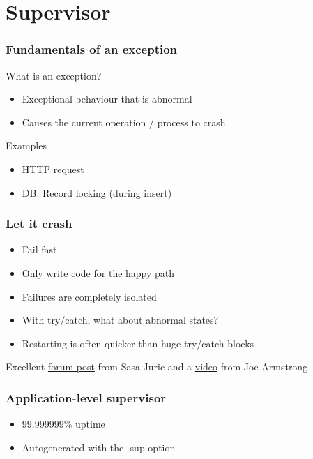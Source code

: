 \section{Supervisor}

\frame{\tableofcontents[currentsection]}

\begin{frame}
    \frametitle{Fundamentals of an exception}
    What is an exception?
     \begin{itemize}
         \item Exceptional behaviour that is abnormal
         \item Causes the current operation / process to crash
     \end{itemize}

     \vfill
     
     Examples
     \begin{itemize}
         \item HTTP request
         \item DB: Record locking (during insert)
     \end{itemize}
\end{frame}


\begin{frame}
    \frametitle{Let it crash}
    \begin{itemize}
         \item Fail fast
         \item Only write code for the happy path
         \item Failures are completely isolated
         \item With try/catch, what about abnormal states?
         \item Restarting is often quicker than huge try/catch blocks
    \end{itemize}
    
    \vfill

    \tiny 
    Excellent 
    \href{https://elixirforum.com/t/understanding-the-advantages-of-let-it-crash-term/9748/19?u=wfransen}{forum post} 
    from Sasa Juric and a     
    \href{https://elixirforum.com/t/understanding-the-advantages-of-let-it-crash-term/9748/21?u=wfransen}{video}
    from Joe Armstrong 
\end{frame}


\begin{frame}
    \frametitle{Application-level supervisor}
    \begin{itemize}
        \item 99.999999\% uptime
        \item Autogenerated with the -sup option
    \end{itemize}
\end{frame}

